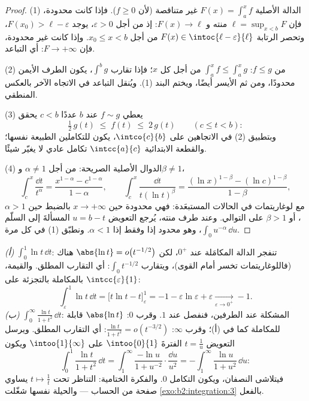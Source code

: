 \begin{proof}
(1) الدالة الأصلية $F(x) = \int_a^x f$ غير متناقصة (لأن $f \geq
0$). فإذا كانت محدودة، فإن $\ell = \sup_{x < b}F$ منته و
$F(x) \to \ell$: إذ من أجل $\varepsilon > 0$، يوجد $F(x_0) > \ell -
\varepsilon$، وتحصر الرتابة $F(x) \in
\intoc{\ell - \varepsilon}{\ell}$ من أجل $x_0 \leq x < b$. وإذا كانت
غير محدودة، فإن $F \to +\infty$: أي التباعد.

(2) من $f \leq g$: $\int_a^x f \leq \int_a^x g$ من أجل كل $x$؛
فإذا تقارب $\int^b g$، يكون الطرف الأيمن محدودًا، ومن ثم
الأيسر أيضًا، ويختم البند (1). ويُنقل التباعد في الاتجاه
الآخر بالعكس المنطقي.

(3) يعطي $f \sim g$ عند $b$ عددًا $c < b$ يحقق
\[
\tfrac12\,g(t) \;\leq\; f(t) \;\leq\; 2\,g(t)
\qquad (c \leq t < b) :
\]
وبتطبيق (2) في الاتجاهين على $\intco{c}{b}$، يكون للتكاملين
الطبيعة نفسها؛ والقطعة الابتدائية $\intcc{a}{c}$ تكامل
عادي لا يغيّر شيئًا.

(4) الدوال الأصلية الصريحة: من أجل $\alpha \neq 1$ و$\beta \neq 1$،
\[
\int_c^x \frac{\dd t}{t^\alpha}
= \frac{x^{1-\alpha} - c^{1-\alpha}}{1 - \alpha},
\qquad
\int_c^x \frac{\dd t}{t(\ln t)^\beta}
= \frac{(\ln x)^{1-\beta} - (\ln c)^{1-\beta}}{1 - \beta},
\]
مع لوغاريتمات في الحالات المستبعَدة: فهي محدودة حين $x \to
+\infty$ بالضبط حين $\alpha > 1$، أو $\beta > 1$ على التوالي. وعند طرف
منته، يُرجع التعويض $u = b - t$ المسألةَ إلى
السلّم $\int_0 u^{-\alpha}\,\dd u$، وهو محدود إذا وفقط إذا $\alpha < 1$.
ونطبّق (1) في كل مرة.
\end{proof}

\begin{example}\label{ex:b2:integration:warmups}
\emph{(أ)} $\displaystyle\int_0^1 \ln t\,\dd t$: تنفجر الدالة المكامَلة
عند $0^+$، لكن $\abs{\ln t} = o\bigl(t^{-1/2}\bigr)$
هناك (فاللوغاريتمات تخسر أمام القوى)، ويتقارب $\int_0 t^{-1/2}$: أي التقارب المطلق. والقيمة، بالمكاملة بالتجزئة على
$\intcc{\varepsilon}{1}$:
\[
\int_\varepsilon^1 \ln t\,\dd t
= \bigl[t\ln t - t\bigr]_\varepsilon^1
= -1 - \varepsilon\ln\varepsilon + \varepsilon
\xrightarrow[\varepsilon\to0^+]{} -1 .
\]
\emph{(ب)} $\displaystyle\int_0^\infty \frac{\ln t}{1 +
t^2}\,\dd t$: المشكلة عند الطرفين، فنفصل عند $1$. وقرب $0$:
$\abs{\ln t}$ قابلة للمكاملة كما في (أ)؛ وقرب $\infty$: $\frac{\ln
t}{1+t^2} = o(t^{-3/2})$: أي التقارب المطلق. ويرسل
التعويض $t = \frac1u$ الفترةَ $\intoo{0}{1}$ على
$\intoo{1}{\infty}$ ويكون
\[
\int_0^1 \frac{\ln t}{1+t^2}\,\dd t
= \int_1^{\infty} \frac{-\ln u}{1 + u^{-2}}\cdot
\frac{\dd u}{u^2}
= -\int_1^\infty \frac{\ln u}{1+u^2}\,\dd u :
\]
فيتلاشى النصفان، ويكون التكامل $0$. والفكرة
الختامية: التناظر تحت $t \mapsto \frac1t$ يساوي صفحة من
الحساب --- والحيلة نفسها شغّلت
\cref{exo:b2:integration:3} بالفعل.
\end{example}

